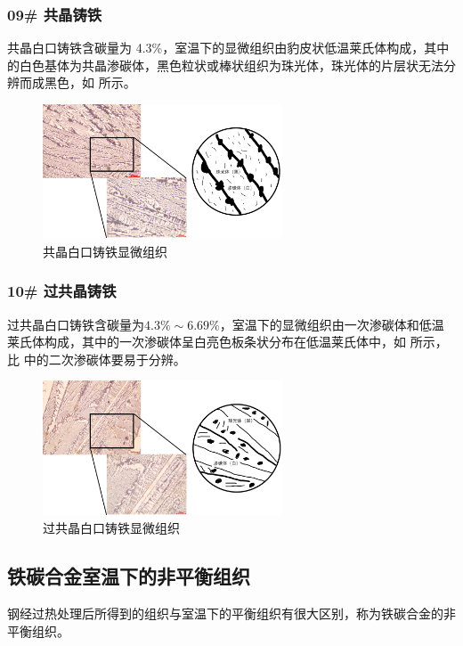 \documentclass[a4paper,utf8]{article}
\begin{document}
        \subsubsection{09# 共晶铸铁}
            共晶白口铸铁含碳量为 4.3\%，室温下的显微组织由豹皮状低温莱氏体构成，其中的白色基体为共晶渗碳体，黑色粒状或棒状组织为珠光体，珠光体的片层状无法分辨而成黑色，如 所示。
            \begin{figure}[!ht]
                \includegraphics[height=40mm]{result/6.pdf}
                \caption{共晶白口铸铁显微组织\label{fig:6}}
            \end{figure}

        \subsubsection{10# 过共晶铸铁}
            过共晶白口铸铁含碳量为$4.3\%\sim 6.69\%$，室温下的显微组织由一次渗碳体和低温莱氏体构成，其中的一次渗碳体呈白亮色板条状分布在低温莱氏体中，如 所示，比 中的二次渗碳体要易于分辨。
            \begin{figure}[!ht]
                \includegraphics[height=40mm]{result/7.pdf}
                \caption{过共晶白口铸铁显微组织\label{fig:7}}
            \end{figure}
            \newpage
    \subsection{铁碳合金室温下的非平衡组织}
        钢经过热处理后所得到的组织与室温下的平衡组织有很大区别，称为铁碳合金的非平衡组织。\par
\end{document}
